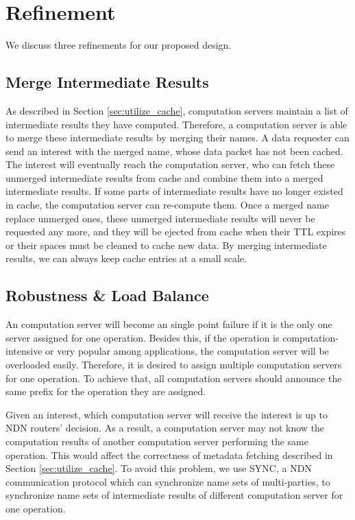 \section{Refinement}
We discuss three refinements for our proposed design.
\subsection{Merge Intermediate Results}\label{sec:merge}
As described in Section \ref{sec:utilize_cache}, computation servers maintain a list
of intermediate results they have computed.  Therefore, a computation server is
able to merge these intermediate results by merging their names.  A data
requester can send an {\sc interest} with the merged name, whose {\sc data}
packet has not been cached.  The {\sc interest} will eventually reach the
computation server, who can fetch these unmerged intermediate results from cache
and combine them into a merged intermediate results.  If some parts of
intermediate results have no longer existed in cache, the computation server can
re-compute them.  Once a merged name replace unmerged ones, these unmerged
intermediate results will never be requested any more, and they will be ejected
from cache when their TTL expires or their spaces must be cleaned to cache new
data.  By merging intermediate results, we can always keep cache entries at a
small scale.
\subsection{Robustness \& Load Balance} \label{sec:robust}
An computation server will become an single point failure if it is the only one
server assigned for one operation.  Besides this, if the operation is
computation-intensive or very popular among applications, the computation server
will be overloaded easily.  Therefore, it is desired to assign multiple
computation servers for one operation.  To achieve that, all computation servers
should announce the same prefix for the operation they are assigned.  

Given an {\sc interest}, which computation server will receive the {\sc
  interest} is up to NDN routers' decision.  As a result, a computation server
may not know the computation results of another computation server performing
the same operation.  This would affect the correctness of metadata fetching
described in Section \ref{sec:utilize_cache}.  To avoid this problem, we use
SYNC, a NDN communication protocol which can synchronize name sets of
multi-parties, to synchronize name sets of intermediate results of different
computation server for one operation. 
